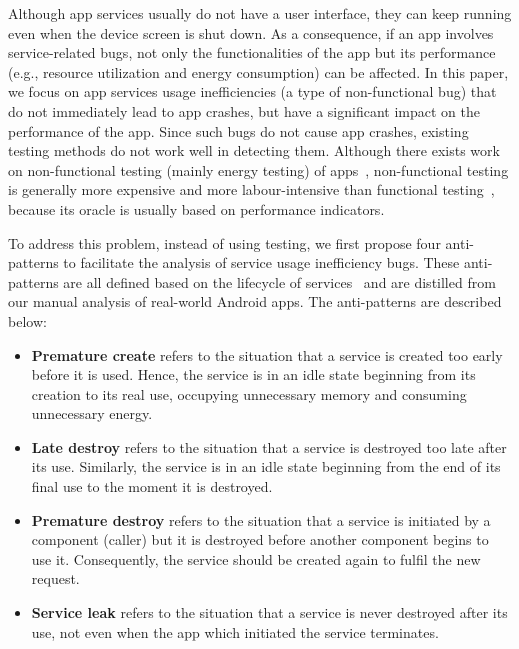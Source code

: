 \documentclass[sigconf,review, anonymous]{acmart}
\begin{document}
Although app services usually do not have a user interface, they can keep running
even when the device screen is shut down. As a consequence, if an app involves
service-related bugs, not only the functionalities of the app but its
performance (e.g., resource utilization and energy consumption) can be affected.
In this paper, we focus on app services usage inefficiencies (a type of non-functional bug) that do not immediately lead to app crashes, but
have a significant impact on the performance of the app.
Since such bugs do not cause app crashes, existing testing methods do
not work well in detecting them.
Although there exists work on non-functional testing (mainly energy testing) of
apps~\cite{LiuXC14,BanerjeeC0R14,LiuXCL14,BehrouzSBM16,JabbarvandM17},
non-functional testing is generally more expensive and more labour-intensive than functional
testing~\cite{BehrouzSBM16}, because its oracle is usually based on performance
indicators.


To address this problem, instead of using testing, we first propose four
anti-patterns to facilitate the analysis of service usage
inefficiency bugs. These anti-patterns are all defined based on the lifecycle
of services~\cite{Androidservice} and are distilled from our manual analysis
of real-world Android apps. The anti-patterns are described below:
\begin{itemize}
  \item {\bf Premature create} refers to the situation that a
service is created too early before it is used. Hence, the service is in
an idle state beginning from its creation to its real use, occupying unnecessary
memory and consuming unnecessary energy.
\item  {\bf Late destroy} refers to the situation
that a service is destroyed too late after its use. Similarly, the service is in
an idle state beginning from the end of its final use to the moment it is destroyed.
\item {\bf Premature destroy} refers to the situation that a service is initiated by a
component (caller) but it is destroyed before another component begins to use
it. Consequently, the service should be created again to fulfil the new request.
\item {\bf Service leak} refers to the situation that a service is never destroyed
after its use, not even when the app which initiated the service terminates.
\end{itemize}
\end{document}
